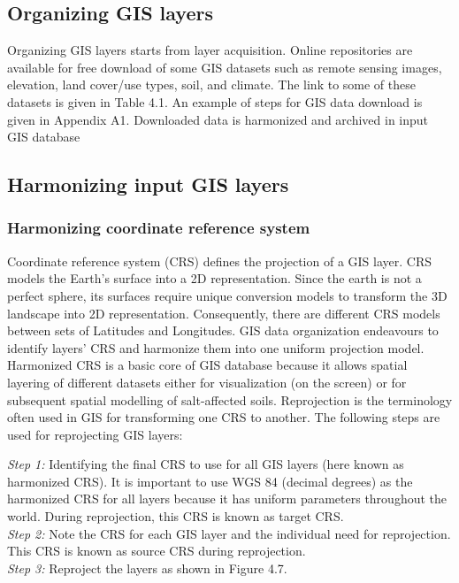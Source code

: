 \documentclass[
  10pt,
  b5paper,
]{book}
\begin{document}
\hypertarget{organizing-gis-layers}{%
\subsection{Organizing GIS layers}\label{organizing-gis-layers}}

Organizing GIS layers starts from layer acquisition. Online repositories are available for free download of some GIS datasets such as remote sensing images, elevation, land cover/use types, soil, and climate. The link to some of these datasets is given in Table 4.1. An example of steps for GIS data download is given in Appendix A1. Downloaded data is harmonized and archived in input GIS database

\hypertarget{harmonizing-input-gis-layers}{%
\subsection{Harmonizing input GIS layers}\label{harmonizing-input-gis-layers}}

\hypertarget{harmonizing-coordinate-reference-system}{%
\subsubsection{Harmonizing coordinate reference system}\label{harmonizing-coordinate-reference-system}}

Coordinate reference system (CRS) defines the projection of a GIS layer. CRS models the Earth's surface into a 2D representation. Since the earth is not a perfect sphere, its surfaces require unique conversion models to transform the 3D landscape into 2D representation. Consequently, there are different CRS models between sets of Latitudes and Longitudes. GIS data organization endeavours to identify layers' CRS and harmonize them into one uniform projection model. Harmonized CRS is a basic core of GIS database because it allows spatial layering of different datasets either for visualization (on the screen) or for subsequent spatial modelling of salt-affected soils. Reprojection is the terminology often used in GIS for transforming one CRS to another. The following steps are used for reprojecting GIS layers:

\emph{Step 1:} Identifying the final CRS to use for all GIS layers (here known as harmonized CRS).
It is important to use WGS 84 (decimal degrees) as the harmonized CRS for all layers because it has uniform parameters throughout the world. During reprojection, this CRS is known as target CRS.\\
\emph{Step 2:} Note the CRS for each GIS layer and the individual need for reprojection. This CRS is known as source CRS during reprojection.\\
\emph{Step 3:} Reproject the layers as shown in Figure 4.7.
\end{document}
